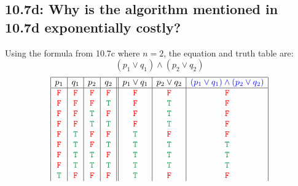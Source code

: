 \documentclass{article}
\begin{document}
\subsection*{10.7d: Why is the algorithm mentioned in 10.7d exponentially costly?}
Using the formula from 10.7c where $n=2$, the equation and truth table are:
\[(p_1\lor q_1)\land(p_2\lor q_2)\]
\[\begin{array}{|c|c|c|c||c|c|c|}
\hline
p_1&q_1&p_2&q_2&p_1\lor q_1&p_2\lor q_2&\textcolor{blue}{(p_1\lor q_1)\land(p_2\lor q_2)}\\
\hline
\textcolor{red}{\tt{F}}&\textcolor{red}{\tt{F}}&\textcolor{red}{\tt{F}}&\textcolor{red}{\tt{F}}&\textcolor{red}{\tt{F}}&\textcolor{red}{\tt{F}}&\textcolor{red}{\tt{F}}\\
\textcolor{red}{\tt{F}}&\textcolor{red}{\tt{F}}&\textcolor{red}{\tt{F}}&\textcolor{ForestGreen}{\tt{T}}&\textcolor{red}{\tt{F}}&\textcolor{ForestGreen}{\tt{T}}&\textcolor{red}{\tt{F}}\\
\textcolor{red}{\tt{F}}&\textcolor{red}{\tt{F}}&\textcolor{ForestGreen}{\tt{T}}&\textcolor{red}{\tt{F}}&\textcolor{red}{\tt{F}}&\textcolor{ForestGreen}{\tt{T}}&\textcolor{red}{\tt{F}}\\
\textcolor{red}{\tt{F}}&\textcolor{red}{\tt{F}}&\textcolor{ForestGreen}{\tt{T}}&\textcolor{ForestGreen}{\tt{T}}&\textcolor{red}{\tt{F}}&\textcolor{ForestGreen}{\tt{T}}&\textcolor{red}{\tt{F}}\\
\textcolor{red}{\tt{F}}&\textcolor{ForestGreen}{\tt{T}}&\textcolor{red}{\tt{F}}&\textcolor{red}{\tt{F}}&\textcolor{ForestGreen}{\tt{T}}&\textcolor{red}{\tt{F}}&\textcolor{red}{\tt{F}}\\
\textcolor{red}{\tt{F}}&\textcolor{ForestGreen}{\tt{T}}&\textcolor{red}{\tt{F}}&\textcolor{ForestGreen}{\tt{T}}&\textcolor{ForestGreen}{\tt{T}}&\textcolor{ForestGreen}{\tt{T}}&\textcolor{ForestGreen}{\tt{T}}\\
\textcolor{red}{\tt{F}}&\textcolor{ForestGreen}{\tt{T}}&\textcolor{ForestGreen}{\tt{T}}&\textcolor{red}{\tt{F}}&\textcolor{ForestGreen}{\tt{T}}&\textcolor{ForestGreen}{\tt{T}}&\textcolor{ForestGreen}{\tt{T}}\\
\textcolor{red}{\tt{F}}&\textcolor{ForestGreen}{\tt{T}}&\textcolor{ForestGreen}{\tt{T}}&\textcolor{ForestGreen}{\tt{T}}&\textcolor{ForestGreen}{\tt{T}}&\textcolor{ForestGreen}{\tt{T}}&\textcolor{ForestGreen}{\tt{T}}\\
\textcolor{ForestGreen}{\tt{T}}&\textcolor{red}{\tt{F}}&\textcolor{red}{\tt{F}}&\textcolor{red}{\tt{F}}&\textcolor{ForestGreen}{\tt{T}}&\textcolor{red}{\tt{F}}&\textcolor{red}{\tt{F}}\\

\end{array}\]
\end{document}
